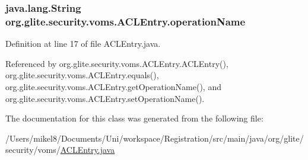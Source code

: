 \hypertarget{classorg_1_1glite_1_1security_1_1voms_1_1ACLEntry_a77b8300ffe00ce97ec1a27eb245b4a0e}{
\subsubsection[{operationName}]{\setlength{\rightskip}{0pt plus 5cm}java.lang.String {\bf org.glite.security.voms.ACLEntry.operationName}}}
\label{classorg_1_1glite_1_1security_1_1voms_1_1ACLEntry_a77b8300ffe00ce97ec1a27eb245b4a0e}


Definition at line 17 of file ACLEntry.java.



Referenced by org.glite.security.voms.ACLEntry.ACLEntry(), org.glite.security.voms.ACLEntry.equals(), org.glite.security.voms.ACLEntry.getOperationName(), and org.glite.security.voms.ACLEntry.setOperationName().



The documentation for this class was generated from the following file:\begin{DoxyCompactItemize}
\item 
/Users/mikel8/Documents/Uni/workspace/Registration/src/main/java/org/glite/security/voms/\hyperlink{ACLEntry_8java}{ACLEntry.java}\end{DoxyCompactItemize}
